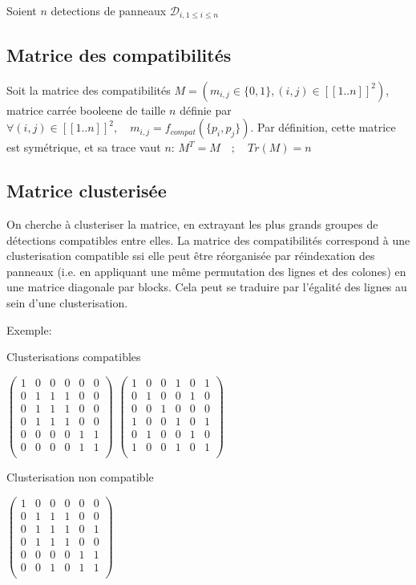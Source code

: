 \documentclass{article}
\begin{document}
Soient \(n\) detections de panneaux \(\mathscr{D}_{i, 1\leq i\leq n}\)

\subsection{Matrice des compatibilités}

Soit la matrice des compatibilités \(M = (m_{i,j} \in \{0, 1\}, (i, j) \in [\![1..n]\!]^{2})\), matrice carrée booleene de taille \(n\) définie par \(\forall (i, j) \in [\![1..n]\!]^{2}, \quad m_{i,j} = f_{compat}(\{p_{i}, p_{j}\})\). Par définition, cette matrice est symétrique, et sa trace vaut \(n\): \(M^{T} = M \quad ; \quad Tr(M) = n\)

\subsection{Matrice clusterisée}

On cherche à clusteriser la matrice, en extrayant les plus grands groupes de détections compatibles entre elles.
La matrice des compatibilités correspond à une clusterisation compatible ssi elle peut être réorganisée par réindexation des panneaux (i.e. en appliquant une même permutation des lignes et des colones) en une matrice diagonale par blocks. Cela peut se traduire par l'égalité des lignes au sein d'une clusterisation.

Exemple:

Clusterisations compatibles

\(\begin{pmatrix}
	1&0&0&0&0&0	\\
	0&1&1&1&0&0	\\
	0&1&1&1&0&0	\\
	0&1&1&1&0&0	\\
	0&0&0&0&1&1	\\
	0&0&0&0&1&1	\\
\end{pmatrix}\)
\(\begin{pmatrix}
	1&0&0&1&0&1	\\
	0&1&0&0&1&0	\\
	0&0&1&0&0&0	\\
	1&0&0&1&0&1	\\
	0&1&0&0&1&0	\\
	1&0&0&1&0&1	\\
\end{pmatrix}\)

Clusterisation non compatible

\(\begin{pmatrix}
	1&0&0&0&0&0	\\
	0&1&1&1&0&0	\\
	0&1&1&1&0&1	\\
	0&1&1&1&0&0	\\
	0&0&0&0&1&1	\\
	0&0&1&0&1&1	\\
\end{pmatrix}\)
\end{document}
